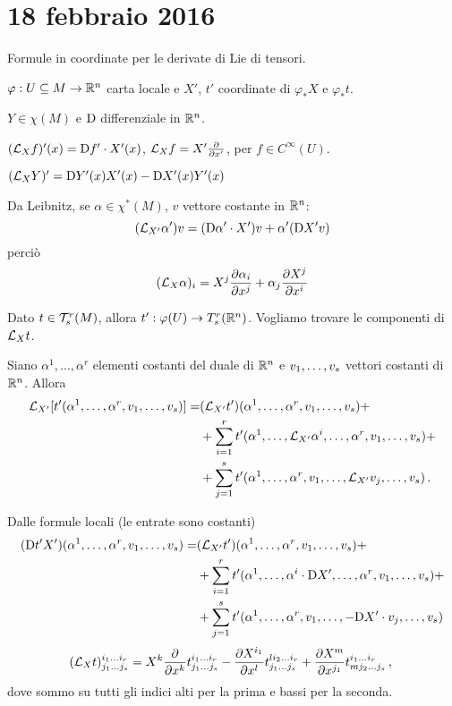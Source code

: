 \chapter{18 febbraio 2016}

Formule in coordinate per le derivate di Lie di tensori.

$\varphi:U\subseteq M \to \R^n$ carta locale e $X'$, $t'$ coordinate di $\varphi_*X$ e $\varphi_*t$.

$Y\in\chi(M)$ e $\Diff$ differenziale in $\R^n$.

$(\Lie_Xf)'(x) = \Diff f'\cdot X'(x)$, $\Lie_X f = X'\DerParz{}{x'}$, per $f\in C^\infty(U)$.

$(\Lie_XY)' = \Diff Y'(x) X'(x) -\Diff X'(x) Y'(x)$

Da Leibnitz, se $\alpha\in\chi^*(M)$, $v$ vettore costante in $\R^n$:
\begin{equation*}
	(\Lie_{X'}\alpha')v = (\Diff \alpha'\cdot X') v + \alpha' (\Diff X' v)
\end{equation*}
perciò
\begin{equation*}
	(\Lie_X\alpha)_i = X^j \DerParz{\alpha_i}{x^j} + \alpha_j \DerParz{X^j}{x^i}
\end{equation*}

Dato $t\in\Tau_s^r(M)$, allora $t':\varphi(U)\to T_s^r(\R^n)$.
Vogliamo trovare le componenti di $\Lie_Xt$.

Siano $\alpha^1,\ldots,\alpha^r$ elementi costanti del duale di $\R^n$ e $\seq{v}{s}{,}$ vettori costanti di $\R^n$. Allora
\begin{align*}
	\Lie_{X'}[t'(\alpha^1,\ldots,\alpha^r,\seq{v}{s}{,})] =& (\Lie_{X'}t')(\alpha^1,\ldots,\alpha^r,\seq{v}{s}{,}) +\\
	&+\sum_{i=1}^r t'(\alpha^1,\ldots, \Lie_{X'}\alpha^i,\ldots, \alpha^r, \seq{v}{s}{,}) +\\
	&+\sum_{j=1}^s t'(\alpha^1,\ldots,\alpha^r,v_1,\ldots,\Lie_{X'}v_j,\ldots,v_s) \punto
\end{align*}

Dalle formule locali (le entrate sono costanti)
\begin{align*}
	(\Diff t'X') (\seqa{\alpha}{r}{,}, \seqb{v}{s}{,}) =& (\Lie_{X'}t')(\seqa{\alpha}{r}{,}, \seqb{v}{s}{,})+\\ 
	&+ \sum_{i=1}^r t'(\alpha^1,\ldots, \alpha^i\cdot\Diff X',\ldots, \alpha^r, \seq{v}{s}{,}) +\\
	&+\sum_{j=1}^s t'(\alpha^1,\ldots,\alpha^r,v_1,\ldots,-\Diff X'\cdot v_j,\ldots,v_s)
\end{align*}
\begin{equation*}
	(\Lie_Xt)_{\seqb{j}{s}{}}^{\seqb{i}{r}{}} = X^k \DerParz{}{x^k} t_{\seqb{j}{s}{}}^{\seqb{i}{r}{}} - \DerParz{X^{i_1}}{x^l} t_{\seqb{j}{s}{}}^{li_2\ldots i_r} + \DerParz{X^m}{x^{j_1}} t^{\seqb{i}{r}{}}_{mj_2\ldots j_s} \virgola
\end{equation*}
dove sommo su tutti gli indici alti per la prima e bassi per la seconda.

